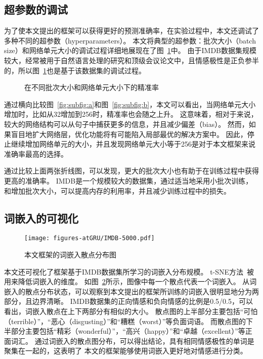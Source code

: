 \subsection{超参数的调试}
为了使本文提出的框架可以获得更好的预测准确率，在实验过程中，本文还调试了多种不同的超参数（hyperparameters）。
本文将典型的超参数：批次大小（batch size）和网络单元大小的调试过程详细地展现在了图~\ref{fig:fig3}中。
由于IMDB数据集规模较大，经常被用于自然语言处理的研究和顶级会议论文中，且情感极性是正负参半的，所以图~\ref{fig:fig3}也是基于该数据集的调试过程。

\begin{figure}[h!]
	\centering
	\caption{在不同批次大小和网络单元大小下的精准率}
	\label{fig:fig3}
\end{figure}

通过横向比较图~\ref{fig:subfig:a}和图~\ref{fig:subfig:b}，本文可以看出，当网络单元大小增加时，比如从32增加到256时，精准率也会随之上升。
这意味着，相对于来说，较大的网络结构可以从句子中捕获更多的信息，并且减少偏差（bias）。
然而，如果盲目地扩大网络层，优化功能将有可能陷入局部最优的解决方案中。
因此，停止继续增加网络单元的大小，并且发现网络单元大小等于256是对于本文框架来说准确率最高的选择。

通过比较上面两张折线图，可以发现，更大的批次大小也有助于在训练过程中获得更高的准确率。
IMDB是一个规模较大的数据集，通过适当地采用小批次训练，和增加批次大小，可以提高内存的利用率，并且减少训练过程中的损失。

\subsection{词嵌入的可视化}
\begin{figure}[h!]
	\centering
	\texttt{[image: figures-atGRU/IMDB-5000.pdf]}
	\caption{本文框架的词嵌入散点分布图}
	\label{fig:fig4}
\end{figure}

本文还可视化了框架基于IMDB数据集所学习的词嵌入分布规模。
t-SNE方法~被用来降低词嵌入的维度。
如图~\ref{fig:fig4}所示，图像中每一个散点代表一个词嵌入。
从词嵌入的散点分布状态，可以观察到本文提出的框架所训练的词嵌入很明显地分为两部分，且边界清晰。
IMDB数据集的正向情感和负向情感的比例是0.5/0.5，可以看出，词嵌入散点在上下两部分有相似的大小。
散点图的上半部分主要包括“可怕（terrible）”，“恶心（disgusting）”和“糟糕（worst）”等负面词语。
而散点图的下半部分主要包括“精彩（wonderful）”，“高兴（happy）”和“卓越（excellent）”等正面词汇。
通过词嵌入的散点图分布，可以得出结论，具有相同情感极性的单词是聚集在一起的，这表明了
本文的框架能够使用词嵌入更好地对情感进行分类。

